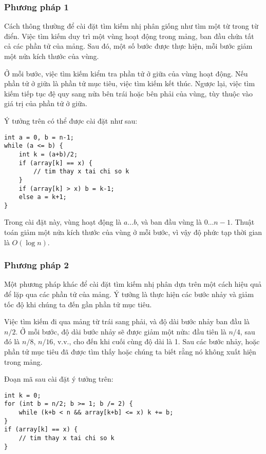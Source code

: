 \subsubsection{Phương pháp 1}

Cách thông thường để cài đặt tìm kiếm nhị phân
giống như tìm một từ trong từ điển.
Việc tìm kiếm duy trì một vùng hoạt động trong mảng,
ban đầu chứa tất cả các phần tử của mảng.
Sau đó, một số bước được thực hiện,
mỗi bước giảm một nửa kích thước của vùng.

Ở mỗi bước, việc tìm kiếm kiểm tra phần tử ở giữa
của vùng hoạt động.
Nếu phần tử ở giữa là phần tử mục tiêu,
việc tìm kiếm kết thúc.
Ngược lại, việc tìm kiếm tiếp tục đệ quy
sang nửa bên trái hoặc bên phải của vùng,
tùy thuộc vào giá trị của phần tử ở giữa.

Ý tưởng trên có thể được cài đặt như sau:
\begin{lstlisting}
int a = 0, b = n-1;
while (a <= b) {
    int k = (a+b)/2;
    if (array[k] == x) {
        // tim thay x tai chi so k
    }
    if (array[k] > x) b = k-1;
    else a = k+1;
}
\end{lstlisting}

Trong cài đặt này, vùng hoạt động là $a \ldots b$,
và ban đầu vùng là $0 \ldots n-1$.
Thuật toán giảm một nửa kích thước của vùng ở mỗi bước,
vì vậy độ phức tạp thời gian là $O(\log n)$.

\subsubsection{Phương pháp 2}

Một phương pháp khác để cài đặt tìm kiếm nhị phân
dựa trên một cách hiệu quả để lặp qua
các phần tử của mảng.
Ý tưởng là thực hiện các bước nhảy và giảm tốc độ
khi chúng ta đến gần phần tử mục tiêu.

Việc tìm kiếm đi qua mảng từ trái sang
phải, và độ dài bước nhảy ban đầu là $n/2$.
Ở mỗi bước, độ dài bước nhảy sẽ được giảm một nửa:
đầu tiên là $n/4$, sau đó là $n/8$, $n/16$, v.v., cho đến khi
cuối cùng độ dài là 1.
Sau các bước nhảy, hoặc phần tử mục tiêu đã
được tìm thấy hoặc chúng ta biết rằng nó không xuất hiện trong mảng.

Đoạn mã sau cài đặt ý tưởng trên:
\begin{lstlisting}
int k = 0;
for (int b = n/2; b >= 1; b /= 2) {
    while (k+b < n && array[k+b] <= x) k += b;
}
if (array[k] == x) {
    // tim thay x tai chi so k
}
\end{lstlisting}

